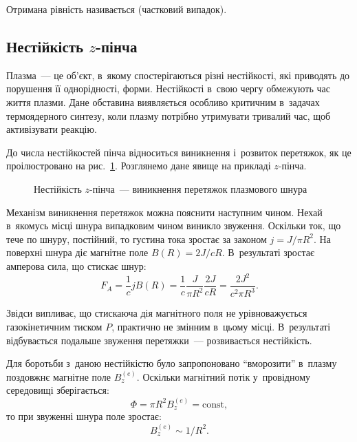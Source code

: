 Отримана рівність називається  (частковий випадок).

\subsection{Нестійкість $z$-пінча}

Плазма~--- це об'єкт, в~якому спостерігаються різні нестійкості, які приводять до порушення її однорідності, форми. Нестійкості в~свою чергу обмежують час життя плазми. Дане обставина виявляється особливо критичним в~задачах термоядерного синтезу, коли плазму потрібно утримувати тривалий час, щоб активізувати реакцію.

До числа нестійкостей пінча відноситься виникнення і~розвиток перетяжок, як це проілюстровано на рис.~\ref{pic:pinch-instability}. Розглянемо дане явище на прикладі $z$-пінча.

\begin{figure}[h!]\centering
	\caption{Нестійкість $z$-пінча~--- виникнення перетяжок плазмового шнура}
	\label{pic:pinch-instability}
\end{figure}

Механізм виникнення перетяжок можна пояснити наступним чином. Нехай в~якомусь місці шнура випадковим чином виникло звуження. Оскільки ток, що тече по шнуру, постійний, то густина тока зростає за законом $j = J/\pi R^2$. На поверхні шнура діє магнітне поле $B(R) = 2J/cR$. В~результаті зростає амперова сила, що стискає шнур:
\begin{equation*}
	F_A = \frac{1}{c}jB(R) = \frac{1}{c}\frac{J}{\pi R^2}\frac{2J}{cR} = \frac{2J^2}{c^2\pi R^3}.
\end{equation*}

Звідси випливає, що стискаюча дія магнітного поля не урівноважується газокінетичним тиском $P$, практично не змінним в~цьому місці. В~результаті відбувається подальше звуження перетяжки~--- розвивається нестійкість.

Для боротьби з~даною нестійкістю було запропоновано \enquote{вморозити} в~плазму поздовжнє магнітне поле $B_z^{(e)}$. Оскільки магнітний потік у~провідному середовищі зберігається:
\begin{equation*}
	\Phi = \pi R^2 B_z^{(e)} = \text{const},
\end{equation*}
то при звуженні шнура поле зростає:
\begin{equation*}
	B_z^{(e)} \sim 1/R^2.
\end{equation*}

